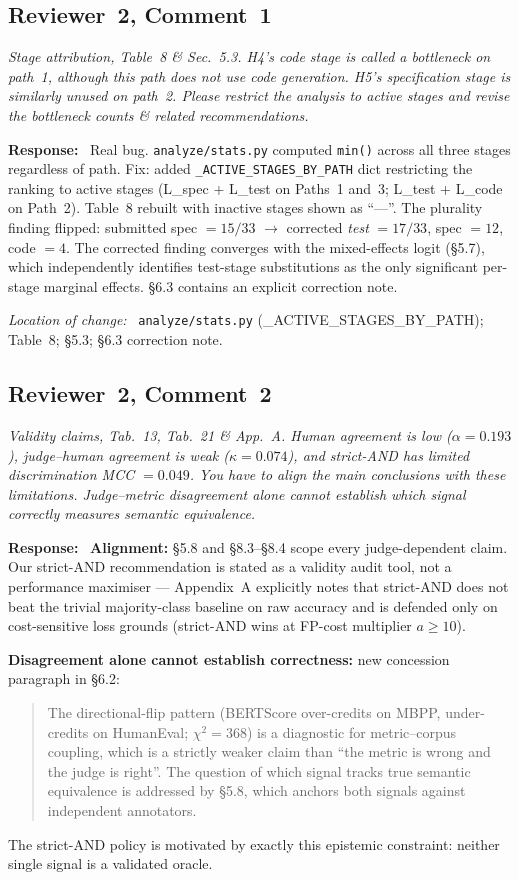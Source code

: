 \documentclass[11pt,a4paper]{article}
\newenvironment{reviewerquote}
  {\begin{tcolorbox}[colback=black!5, colframe=black!15, boxrule=0.3pt,
                     arc=1pt, left=6pt, right=6pt, top=3pt, bottom=3pt,
                     breakable]\itshape\small}
  {\end{tcolorbox}}
\newcommand{\rcomment}[2]{\subsection*{Reviewer~#1, Comment~#2}}
\newcommand{\response}{\noindent\textbf{Response:}\ }
\newcommand{\loc}{\par\smallskip\noindent\textit{Location of change:}\ }
\begin{document}
\rcomment{2}{1}

\begin{reviewerquote}
Stage attribution, Table~8 \& Sec.\ 5.3. H4's code stage is called a bottleneck on path~1, although this path does not use code generation. H5's specification stage is similarly unused on path~2. Please restrict the analysis to active stages and revise the bottleneck counts \& related recommendations.
\end{reviewerquote}

\response{}
Real bug. \texttt{analyze/stats.py} computed \texttt{min()} across all three stages regardless of path. Fix: added \texttt{\_ACTIVE\_STAGES\_BY\_PATH} dict restricting the ranking to active stages (L\_spec + L\_test on Paths~1 and~3; L\_test + L\_code on Path~2). Table~8 rebuilt with inactive stages shown as ``---''. The plurality finding flipped: submitted spec $= 15/33$ $\to$ corrected \emph{test} $= 17/33$, spec $= 12$, code $= 4$. The corrected finding converges with the mixed-effects logit (\S5.7), which independently identifies test-stage substitutions as the only significant per-stage marginal effects. \S6.3 contains an explicit correction note.

\loc{} \texttt{analyze/stats.py} (\_ACTIVE\_STAGES\_BY\_PATH); Table~8; \S5.3; \S6.3 correction note.

\rcomment{2}{2}

\begin{reviewerquote}
Validity claims, Tab.\ 13, Tab.\ 21 \& App.\ A. Human agreement is low ($\alpha = 0.193$), judge--human agreement is weak ($\kappa = 0.074$), and strict-AND has limited discrimination MCC $= 0.049$. You have to align the main conclusions with these limitations. Judge--metric disagreement alone cannot establish which signal correctly measures semantic equivalence.
\end{reviewerquote}

\response{}
\textbf{Alignment:} \S5.8 and \S8.3--\S8.4 scope every judge-dependent claim. Our strict-AND recommendation is stated as a validity audit tool, not a performance maximiser --- Appendix~A explicitly notes that strict-AND does not beat the trivial majority-class baseline on raw accuracy and is defended only on cost-sensitive loss grounds (strict-AND wins at FP-cost multiplier $a \geq 10$).

\textbf{Disagreement alone cannot establish correctness:} new concession paragraph in \S6.2:
\begin{quote}\small
The directional-flip pattern (BERTScore over-credits on MBPP, under-credits on HumanEval; $\chi^2 = 368$) is a diagnostic for metric--corpus coupling, which is a strictly weaker claim than ``the metric is wrong and the judge is right''. The question of which signal tracks true semantic equivalence is addressed by \S5.8, which anchors both signals against independent annotators.
\end{quote}
The strict-AND policy is motivated by exactly this epistemic constraint: neither single signal is a validated oracle.
\end{document}
